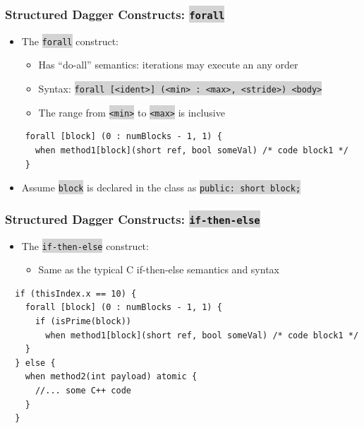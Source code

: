 \documentclass{beamer}
\newcommand{\code}[1]{\colorbox{lightgray}{\texttt{#1}}}
\begin{document}
\begin{frame}[fragile]
  \frametitle{Structured Dagger Constructs: \code{forall}}
  \begin{itemize}
  \item The \code{forall} construct:
    \begin{itemize}
    \item Has ``do-all'' semantics: iterations may execute an any order
    \item Syntax: \code{forall [<ident>] (<min> : <max>, <stride>) <body>}
    \item The range from \code{<min>} to \code{<max>} is inclusive
    \end{itemize}
  \end{itemize}
  \begin{lstlisting}
    forall [block] (0 : numBlocks - 1, 1) {
      when method1[block](short ref, bool someVal) /* code block1 */
    }
  \end{lstlisting}
  \begin{itemize}
    \item Assume \code{block} is declared in the class as \code{public: short block;}
  \end{itemize}
\end{frame}

\begin{frame}[fragile]
  \frametitle{Structured Dagger Constructs: \code{if-then-else}}
  \begin{itemize}
  \item The \code{if-then-else} construct:
    \begin{itemize}
    \item Same as the typical C if-then-else semantics and syntax
    \end{itemize}
  \end{itemize}
  \begin{lstlisting}
  if (thisIndex.x == 10) {
    forall [block] (0 : numBlocks - 1, 1) {
      if (isPrime(block))
        when method1[block](short ref, bool someVal) /* code block1 */
    }
  } else {
    when method2(int payload) atomic {
      //... some C++ code
    }
  }
  \end{lstlisting}
\end{frame}
\end{document}
